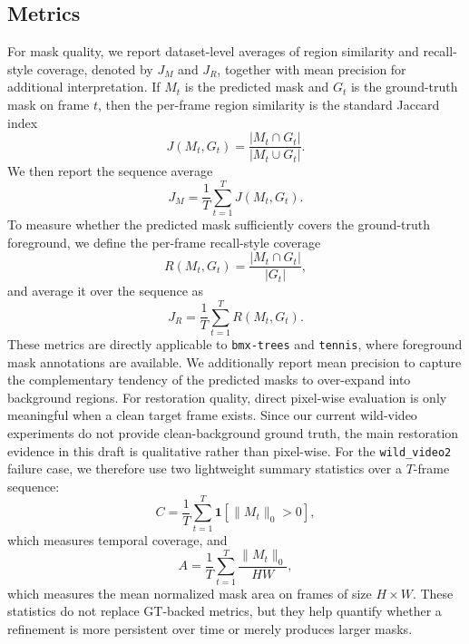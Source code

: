 \documentclass[10pt,twocolumn,letterpaper]{article}
\begin{document}
\subsection{Metrics}
For mask quality, we report dataset-level averages of region similarity and recall-style coverage, denoted by $J_M$ and $J_R$, together with mean precision for additional interpretation.
If $M_t$ is the predicted mask and $G_t$ is the ground-truth mask on frame $t$, then the per-frame region similarity is the standard Jaccard index
\begin{equation}
  J(M_t, G_t) = \frac{|M_t \cap G_t|}{|M_t \cup G_t|}.
\end{equation}
We then report the sequence average
\begin{equation}
  J_M = \frac{1}{T} \sum_{t=1}^{T} J(M_t, G_t).
\end{equation}
To measure whether the predicted mask sufficiently covers the ground-truth foreground, we define the per-frame recall-style coverage
\begin{equation}
  R(M_t, G_t) = \frac{|M_t \cap G_t|}{|G_t|},
\end{equation}
and average it over the sequence as
\begin{equation}
  J_R = \frac{1}{T} \sum_{t=1}^{T} R(M_t, G_t).
\end{equation}
These metrics are directly applicable to \texttt{bmx-trees} and \texttt{tennis}, where foreground mask annotations are available.
We additionally report mean precision to capture the complementary tendency of the predicted masks to over-expand into background regions.
For restoration quality, direct pixel-wise evaluation is only meaningful when a clean target frame exists.
Since our current wild-video experiments do not provide clean-background ground truth, the main restoration evidence in this draft is qualitative rather than pixel-wise.
For the \texttt{wild\_video2} failure case, we therefore use two lightweight summary statistics over a $T$-frame sequence:
\begin{equation}
  C = \frac{1}{T} \sum_{t=1}^{T} \mathbf{1}\!\left[\|M_t\|_0 > 0\right],
\end{equation}
which measures temporal coverage, and
\begin{equation}
  A = \frac{1}{T} \sum_{t=1}^{T} \frac{\|M_t\|_0}{HW},
\end{equation}
which measures the mean normalized mask area on frames of size $H \times W$.
These statistics do not replace GT-backed metrics, but they help quantify whether a refinement is more persistent over time or merely produces larger masks.
\end{document}
